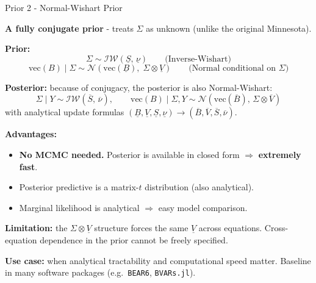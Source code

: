 \documentclass{beamer}
\begin{document}
\begin{frame}{Prior 2 - Normal-Wishart Prior}
\footnotesize

\textbf{A fully conjugate prior} - treats $\Sigma$ as unknown (unlike the original Minnesota).

\medskip
\textbf{Prior:}
\[
\Sigma \sim \mathcal{IW}(\underline{S},\, \underline{\nu})
\qquad\text{(Inverse-Wishart)}
\]
\[
\text{vec}(B) \mid \Sigma \sim \mathcal{N}\!\left(\text{vec}(\underline{B}),\; \Sigma \otimes \underline{V}\right)
\qquad\text{(Normal conditional on } \Sigma\text{)}
\]

\medskip
\textbf{Posterior:} because of conjugacy, the posterior is also Normal-Wishart:
\[
\Sigma \mid Y \sim \mathcal{IW}(\overline{S},\, \overline{\nu}), \qquad
\text{vec}(B) \mid \Sigma, Y \sim \mathcal{N}(\text{vec}(\overline{B}),\, \Sigma \otimes \overline{V})
\]
with analytical update formulas $(\underline{B}, \underline{V}, \underline{S}, \underline{\nu}) \to (\overline{B}, \overline{V}, \overline{S}, \overline{\nu})$.

\medskip
\textbf{Advantages:}
\begin{itemize}
  \item \textbf{No MCMC needed.} Posterior is available in closed form $\Rightarrow$ \textbf{extremely fast}.
  \item Posterior predictive is a matrix-$t$ distribution (also analytical).
  \item Marginal likelihood is analytical $\Rightarrow$ easy model comparison.
\end{itemize}

\textbf{Limitation:} the $\Sigma \otimes \underline{V}$ structure forces the same $\underline{V}$ across equations.
Cross-equation dependence in the prior cannot be freely specified.

\textbf{Use case:} when analytical tractability and computational speed matter. Baseline in many software packages (e.g.\ \texttt{BEAR6}, \texttt{BVARs.jl}).

\end{frame}
\end{document}
